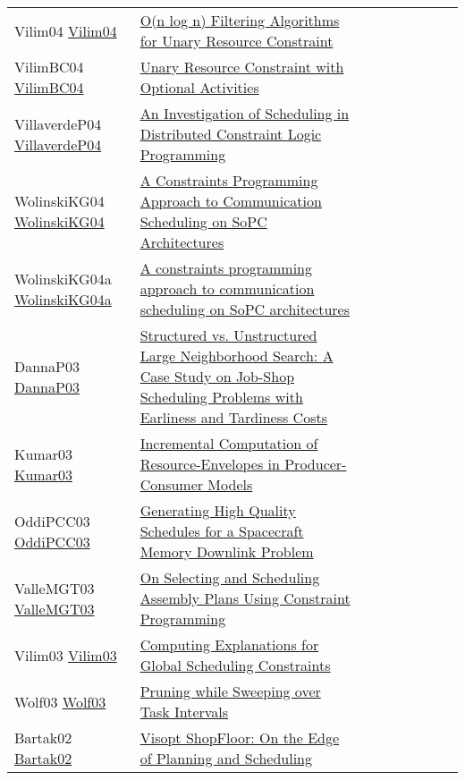 {\begin{longtable}{p{3cm}p{7cm}lllllll}
Vilim04 \href{https://doi.org/10.1007/978-3-540-24664-0\_23}{Vilim04} &  \href{papers/Vilim04.pdf}{O(n log n) Filtering Algorithms for Unary Resource Constraint} &  &  &  &  &  &  & \\
VilimBC04 \href{https://doi.org/10.1007/978-3-540-30201-8\_8}{VilimBC04} &  \href{papers/VilimBC04.pdf}{Unary Resource Constraint with Optional Activities} &  &  &  &  &  &  & \\
VillaverdeP04 \href{}{VillaverdeP04} &  \href{}{An Investigation of Scheduling in Distributed Constraint Logic Programming} &  &  &  &  &  &  & \\
WolinskiKG04 \href{https://doi.org/10.1109/DSD.2004.1333291}{WolinskiKG04} &  \href{papers/WolinskiKG04.pdf}{A Constraints Programming Approach to Communication Scheduling on SoPC Architectures} &  &  &  &  &  &  & \\
WolinskiKG04a \href{https://doi.org/10.1145/968280.968336}{WolinskiKG04a} &  \href{}{A constraints programming approach to communication scheduling on SoPC architectures} &  &  &  &  &  &  & \\
DannaP03 \href{https://doi.org/10.1007/978-3-540-45193-8\_59}{DannaP03} &  \href{papers/DannaP03.pdf}{Structured vs. Unstructured Large Neighborhood Search: {A} Case Study on Job-Shop Scheduling Problems with Earliness and Tardiness Costs} &  &  &  &  &  &  & \\
Kumar03 \href{https://doi.org/10.1007/978-3-540-45193-8\_45}{Kumar03} &  \href{papers/Kumar03.pdf}{Incremental Computation of Resource-Envelopes in Producer-Consumer Models} &  &  &  &  &  &  & \\
OddiPCC03 \href{https://doi.org/10.1007/978-3-540-45193-8\_39}{OddiPCC03} &  \href{papers/OddiPCC03.pdf}{Generating High Quality Schedules for a Spacecraft Memory Downlink Problem} &  &  &  &  &  &  & \\
ValleMGT03 \href{https://doi.org/10.1007/978-3-540-45226-3\_180}{ValleMGT03} &  \href{papers/ValleMGT03.pdf}{On Selecting and Scheduling Assembly Plans Using Constraint Programming} &  &  &  &  &  &  & \\
Vilim03 \href{https://doi.org/10.1007/978-3-540-45193-8\_124}{Vilim03} &  \href{papers/Vilim03.pdf}{Computing Explanations for Global Scheduling Constraints} &  &  &  &  &  &  & \\
Wolf03 \href{https://doi.org/10.1007/978-3-540-45193-8\_50}{Wolf03} &  \href{papers/Wolf03.pdf}{Pruning while Sweeping over Task Intervals} &  &  &  &  &  &  & \\
Bartak02 \href{https://doi.org/10.1007/3-540-46135-3\_39}{Bartak02} &  \href{papers/Bartak02.pdf}{Visopt ShopFloor: On the Edge of Planning and Scheduling} &  &  &  &  &  &  & \\

\end{longtable}}
